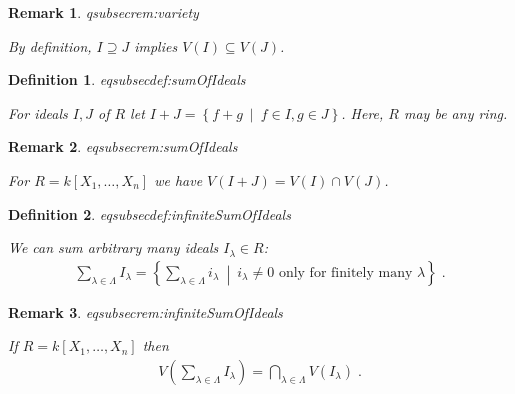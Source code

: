 \documentclass[DIV=14,parskip=full,pointednumbers]{scrartcl}
\theoremstyle{cthm}
\theoremstyle{cvarthm}
\theoremstyle{cdef}
\newtheorem{defi}{Definition}[subsection]
\newtheorem{rem}{Remark}[subsection]
\newcommand{\lbl}[1]{
	\label{#1}
	\ifmmode
	\expandafter\xdef\csname eqsubsec#1\endcsname{\thesubsection}
	\fi
}
\newcommand{\st}{\ \middle|\ }
\begin{document}
	\begin{rem}\lbl{rem:variety}
		By definition, $I\supseteq J$ implies $V(I)\subseteq V(J)$.
	\end{rem}
	\begin{defi}\lbl{def:sumOfIdeals}
		For ideals $I,J$ of $R$ let $I+J =\left\{f+g\st f\in I, g\in J\right\}$. Here, $R$ may be any ring.
	\end{defi}
	\begin{rem}\lbl{rem:sumOfIdeals}
		For $R=k[X_1,\ldots,X_n]$ we have $V(I+J) = V(I)\cap V(J)$.
	\end{rem}
	\begin{defi}\lbl{def:infiniteSumOfIdeals}
		We can sum arbitrary many ideals $I_\lambda\in R$:
		\begin{align*}
		\sum_{\lambda\in\Lambda}I_\lambda = \left\{\sum_{\lambda\in\Lambda} i_\lambda \st i_\lambda \neq 0 \text{ only for finitely many }\lambda\right\}\;.
		\end{align*}
		
	\end{defi}
	\begin{rem}\lbl{rem:infiniteSumOfIdeals}
		If $R=k[X_1,\ldots,X_n]$ then 
		\begin{align*}
		V\left(\sum_{\lambda\in \Lambda} I_\lambda\right) = \bigcap_{\lambda\in\Lambda} V(I_\lambda)\;.
		\end{align*}
	\end{rem}
	
\end{document}
